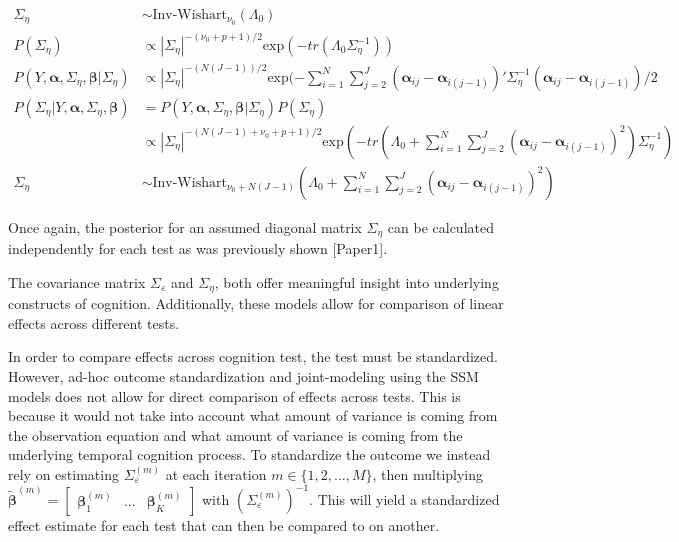 \documentclass[
]{article}
\begin{document}
\begin{equation*}
\begin{aligned}
\Sigma_\eta &\sim \text{Inv-Wishart}_{\nu_0}(\Lambda_0)\\
P(\Sigma_\eta) &\propto |\Sigma_\eta|^{-(\nu_0+p+1)/2}\text{exp}(-tr(\Lambda_0\Sigma_\eta^{-1}))\\
P(Y, \boldsymbol{\alpha}, \Sigma_\eta, \boldsymbol{\beta}|\Sigma_\eta) &\propto |\Sigma_\eta|^{-(N(J-1))/2}\text{exp}(-\sum^N_{i = 1}\sum^{J}_{j= 2} (\boldsymbol{\alpha}_{ij} - \boldsymbol{\alpha}_{i(j-1)})'\Sigma_\eta^{-1}(\boldsymbol{\alpha}_{ij} - \boldsymbol{\alpha}_{i(j-1)})/2 \\
P(\Sigma_\eta|Y, \boldsymbol{\alpha}, \Sigma_\eta, \boldsymbol{\beta}) & = P(Y, \boldsymbol{\alpha}, \Sigma_\eta, \boldsymbol{\beta}|\Sigma_\eta)P(\Sigma_\eta) \\ &\propto |\Sigma_\eta|^{-(N(J-1) +\nu_0+p+1)/2}\text{exp}(-tr(\Lambda_0 + \sum^N_{i = 1}\sum^J_{j= 2} (\boldsymbol{\alpha}_{ij} - \boldsymbol{\alpha}_{i(j-1)})^2)\Sigma_\eta^{-1})\\
\Sigma_\eta & \sim \text{Inv-Wishart}_{\nu_0 + N(J-1)}(\Lambda_0+\sum^N_{i = 1}\sum^J_{j= 2} (\boldsymbol{\alpha}_{ij} - \boldsymbol{\alpha}_{i(j-1)})^2)
\end{aligned}
\end{equation*}

Once again, the posterior for an assumed diagonal matrix \(\Sigma_\eta\) can be calculated independently for each test as was previously shown {[}Paper1{]}.

The covariance matrix \(\Sigma_\varepsilon\) and \(\Sigma_\eta\), both offer meaningful insight into underlying constructs of cognition. Additionally, these models allow for comparison of linear effects across different tests.

In order to compare effects across cognition test, the test must be standardized. However, ad-hoc outcome standardization and joint-modeling using the SSM models does not allow for direct comparison of effects across tests. This is because it would not take into account what amount of variance is coming from the observation equation and what amount of variance is coming from the underlying temporal cognition process. To standardize the outcome we instead rely on estimating \(\Sigma_\varepsilon^{(m)}\) at each iteration \(m \in \{1, 2, ..., M\}\), then multiplying \(\tilde{\boldsymbol{\beta}}^{(m)} = \begin{bmatrix}\boldsymbol{\beta}_1^{(m)} & ... & \boldsymbol{\beta}_K^{(m)}\end{bmatrix}\) with \((\Sigma_\varepsilon^{(m)})^{-1}\). This will yield a standardized effect estimate for each test that can then be compared to on another.
\end{document}

